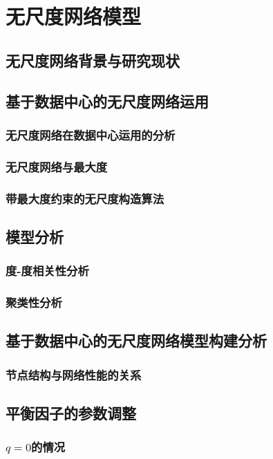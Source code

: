 \documentclass[master]{njuthesis}
\begin{document}
\chapter{无尺度网络模型}\label{chapter_scalefree}
\section{无尺度网络背景与研究现状}
\Blindtext
\section{基于数据中心的无尺度网络运用}
\subsection{无尺度网络在数据中心运用的分析}
\Blindtext
\subsection{无尺度网络与最大度}
\Blindtext
\subsection{带最大度约束的无尺度构造算法}
\Blindtext
\section{模型分析}
\subsection{度-度相关性分析}
\Blindtext
\subsection{聚类性分析}
\Blindtext
\section{基于数据中心的无尺度网络模型构建分析}
\blindtext
\subsection{节点结构与网络性能的关系}
\Blindtext
\section{平衡因子的参数调整}
\blindtext
\subsection{$q=0$的情况}
\Blindtext
\end{document}
